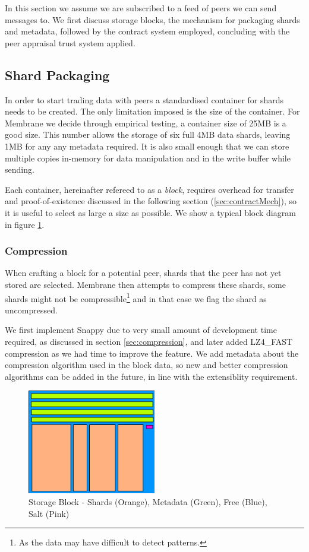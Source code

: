 \documentclass[11pt, a4paper, twoside]{report}
\begin{document}
In this section we assume we are subscribed to a feed of peers we can send messages to. We first discuss storage blocks, the mechanism for packaging shards and metadata, followed by the contract system employed, concluding with the peer appraisal trust system applied.

\subsection{Shard Packaging}

In order to start trading data with peers a standardised container for shards needs to be created. The only limitation imposed is the size of the container. For Membrane we decide through empirical testing, a container size of 25MB is a good size. This number allows the storage of six full 4MB data shards, leaving 1MB for any any metadata required. It is also small enough that we can store multiple copies in-memory for data manipulation and in the write buffer while sending.

Each container, hereinafter refereed to as a \emph{block}, requires overhead for transfer and proof-of-existence discussed in the following section (\ref{sec:contractMech}), so it is useful to select as large a size as possible. We show a typical block diagram in figure \ref{fig:storage-block}.

\subsubsection{Compression}

When crafting a block for a potential peer, shards that the peer has not yet stored are selected. Membrane then attempts to compress these shards, some shards might not be compressible\footnote{As the data may have difficult to detect patterns.} and in that case we flag the shard as uncompressed.

We first implement Snappy due to very small amount of development time required, as discussed in section \ref{sec:compression}, and later added LZ4\_FAST compression as we had time to improve the feature. We add metadata about the compression algorithm used in the block data, so new and better compression algorithms can be added in the future, in line with the extensiblity requirement.

\begin{figure}
 \centering
 \includegraphics[width=0.5\textwidth]{storage-block}
 \caption{Storage Block - Shards (Orange), Metadata (Green), Free (Blue), Salt (Pink)}
 \label{fig:storage-block}
\end{figure}
\end{document}
